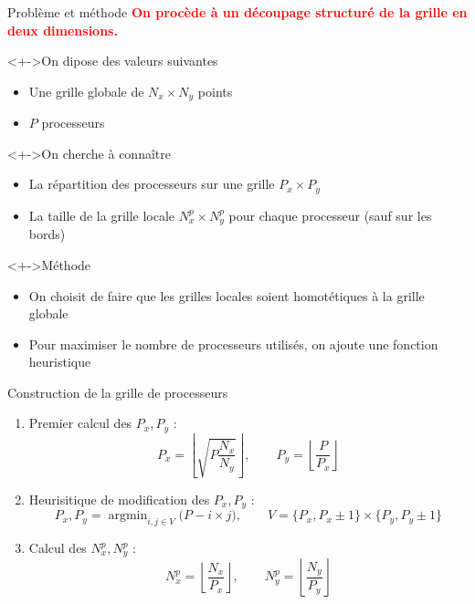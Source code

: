 \documentclass[17pt]{beamer}
\newenvironment{blockitemize}[1]{
  \begin{block}<+->{#1}
    \begin{itemize}
    }{
    \end{itemize}
  \end{block}
}
\begin{document}
\begin{frame}{Problème et méthode}
 \textcolor{red}{\textbf{On procède à un découpage structuré de la grille en deux dimensions.}}
  \begin{blockitemize}{On dipose des valeurs suivantes }
  \item Une grille globale de $N_x\times N_y$ points
  \item $P$ processeurs
  \end{blockitemize}

  \begin{blockitemize}{On cherche à connaître}  
  \item La répartition des processeurs sur une grille $P_x\times P_y$ 
  \item La taille de la grille locale $N^p_x\times N^p_y$ pour chaque processeur (sauf sur les bords)
  \end{blockitemize}
  
  \begin{blockitemize}{Méthode}
  \item On choisit de faire que les grilles locales soient homotétiques à la grille globale 
  \item Pour maximiser le nombre de processeurs utilisés, on ajoute une fonction heuristique
  \end{blockitemize}
\end{frame}


\begin{frame}{Construction de la grille de processeurs}
  \begin{enumerate}
  \item Premier calcul des $P_x, P_y$ : 
    \[P_x = \left\lfloor\sqrt{P\frac{N_x}{N_y}}\right\rfloor, \qquad P_y =
      \left\lfloor\frac{P}{P_x}\right\rfloor \]
  \item Heurisitique de modification des $P_x, P_y$ :
    \[P_x, P_y = \mathop{\text{argmin}}_{i,j\in V}\big(P - i  \times j\big), \qquad V = \{P_x, P_x\pm1\}\times\{P_y, P_y\pm1\}\]
  \item Calcul des $N^p_x, N^p_y$ : 
    \[N^p_x = \left\lfloor\frac{N_x}{P_x}\right\rfloor, \qquad N^p_y = \left\lfloor\frac{N_y}{P_y}\right\rfloor\]
  \end{enumerate}
\end{frame}
\end{document}
